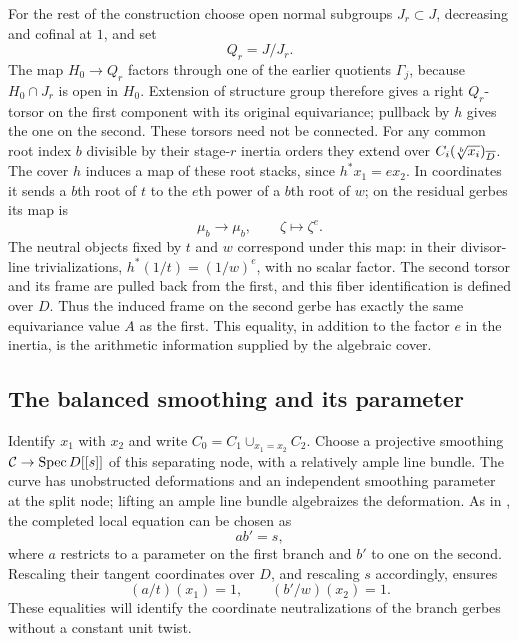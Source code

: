 For the rest of the construction choose open normal subgroups
$J_r\subset J$, decreasing and cofinal at $1$, and set
\begin{equation}\label{eq:nodal-finite-quotients}
                         Q_r=J/J_r.
\end{equation}
The map $H_0\to Q_r$ factors through one of the earlier quotients
$\Gamma_j$, because $H_0\cap J_r$ is open in $H_0$.  Extension of
structure group therefore gives a right $Q_r$-torsor on the first
component with its original equivariance; pullback by $h$ gives the
one on the second.  These torsors need not be connected.  For any common
root index $b$ divisible by their stage-$r$ inertia orders they extend
over $C_i(\sqrt[b]{x_i})_{\overline D}$.  The cover $h$ induces a map of
these root stacks, since $h^*x_1=e x_2$.  In coordinates it sends a
$b$th root of $t$ to the $e$th power of a $b$th root of $w$; on the
residual gerbes its map is
\begin{equation}\label{eq:gerbe-power-map}
                  \mu_b\longrightarrow\mu_b,
                  \qquad \zeta\longmapsto\zeta^e.
\end{equation}
The neutral objects fixed by $t$ and $w$ correspond under this map:
in their divisor-line trivializations,
$h^*(1/t)=(1/w)^e$, with no scalar factor.  The second torsor and its
frame are pulled back from the first, and this fiber identification is
defined over $D$.  Thus the induced frame on the second gerbe has exactly
the same equivariance value $A$ as the first.  This equality, in addition to
the factor $e$ in the inertia, is the arithmetic information supplied
by the algebraic cover.

\subsection{The balanced smoothing and its parameter}

Identify $x_1$ with $x_2$ and write $C_0=C_1\cup_{x_1=x_2}C_2$.
Choose a projective smoothing
$\mathcal C\to\operatorname{Spec} D[[s]]$ of this separating node, with a
relatively ample line bundle.  The curve has unobstructed deformations
and an independent smoothing parameter at the split node; lifting an
ample line bundle algebraizes the deformation.  As in
\cite[Section~8.2]{CT}, the completed local equation can be chosen as
\begin{equation}\label{eq:ordinary-node}
                           a b'=s,
\end{equation}
where $a$ restricts to a parameter on the first branch and $b'$ to
one on the second.  Rescaling their tangent coordinates over $D$, and
rescaling $s$ accordingly, ensures
\[
             (a/t)(x_1)=1,\qquad (b'/w)(x_2)=1.
\]
These equalities will identify the coordinate neutralizations of the
branch gerbes without a constant unit twist.

